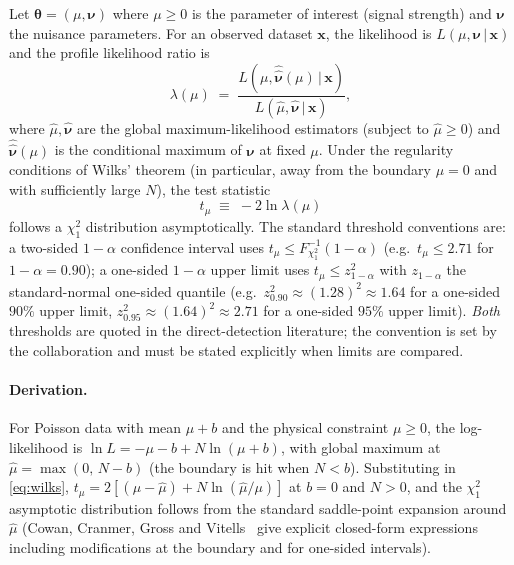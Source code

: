\begin{statement}
\label{stmt:profile-likelihood}
Let $\bm{\theta}=(\mu,\bm{\nu})$ where $\mu\geq 0$ is the
parameter of interest (signal strength) and $\bm{\nu}$ the
nuisance parameters. For an observed dataset $\bm x$, the
likelihood is $L(\mu,\bm\nu\,|\,\bm x)$ and the profile
likelihood ratio is
\begin{equation}
\label{eq:profile-ratio}
\lambda(\mu) \;=\; \frac{L(\mu,\hat{\hat{\bm\nu}}(\mu)\,|\,\bm x)}
{L(\hat\mu,\hat{\bm\nu}\,|\,\bm x)},
\end{equation}
where $\hat\mu,\hat{\bm\nu}$ are the global maximum-likelihood
estimators (subject to $\hat\mu\geq 0$) and
$\hat{\hat{\bm\nu}}(\mu)$ is the conditional maximum of $\bm\nu$
at fixed $\mu$. Under the regularity conditions of Wilks'
theorem (in particular, away from the boundary $\mu=0$ and with
sufficiently large $N$), the test statistic
\begin{equation}
\label{eq:wilks}
t_\mu \;\equiv\; -2\ln\lambda(\mu)
\end{equation}
follows a $\chi^2_1$ distribution asymptotically. The standard
threshold conventions are: a two-sided $1-\alpha$ confidence
interval uses $t_\mu\leq F^{-1}_{\chi^2_1}(1-\alpha)$ (e.g.\
$t_\mu\leq 2.71$ for $1-\alpha=0.90$); a one-sided
$1-\alpha$ upper limit uses $t_\mu\leq z_{1-\alpha}^2$ with
$z_{1-\alpha}$ the standard-normal one-sided quantile (e.g.\
$z_{0.90}^2 \approx (1.28)^2 \approx 1.64$ for a one-sided $90\%$
upper limit, $z_{0.95}^2 \approx (1.64)^2 \approx 2.71$ for a
one-sided $95\%$ upper limit). \emph{Both} thresholds are quoted
in the direct-detection literature; the convention is set by the
collaboration and must be stated explicitly when limits are
compared.
\end{statement}

\paragraph{Derivation.}
For Poisson data with mean $\mu+b$ and the physical constraint
$\mu\geq 0$, the log-likelihood is
$\ln L=-\mu-b+N\ln(\mu+b)$, with global maximum at
$\hat\mu=\max(0,\,N-b)$ (the boundary is hit when $N<b$).
Substituting in \cref{eq:wilks},
$t_\mu=2[(\mu-\hat\mu)+N\ln(\hat\mu/\mu)]$ at $b=0$ and $N>0$,
and the $\chi^2_1$ asymptotic distribution follows from the
standard saddle-point expansion around $\hat\mu$ (Cowan,
Cranmer, Gross and Vitells~\cite{cowan2011} give explicit
closed-form expressions including modifications at the boundary
and for one-sided intervals).

